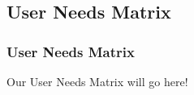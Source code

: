 \documentclass[handout, t]{beamer}
\begin{document}
\subsection{User Needs Matrix}

\begin{frame}
\frametitle{User Needs Matrix}
Our User Needs Matrix will go here!
\end{frame}

\end{document}
